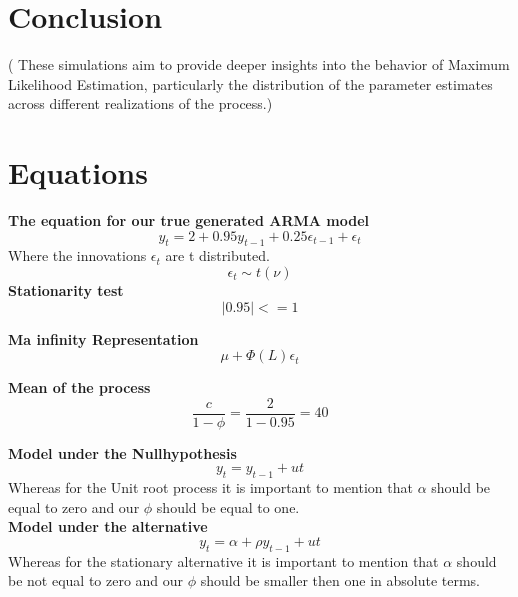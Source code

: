 \documentclass[12pt]{article}
\begin{document}
\section{Conclusion}
( These simulations aim to provide deeper insights into the behavior of Maximum Likelihood Estimation, particularly the distribution of the parameter estimates across different realizations of the process.)






\newpage
\section{Equations}
\textbf{The equation for our true generated ARMA model}
\begin{equation}
    y_t = 2 + 0.95y_{t-1} + 0.25\epsilon_{t-1} + \epsilon_t
\label{eq:arma}
\end{equation}
Where the innovations $\epsilon_t$ are t distributed.
 \begin{equation}
     \epsilon_t \sim t(\nu) 
 \end{equation}
\textbf{Stationarity test}
\begin{equation}
    |0.95| <= 1
    \label{eq:stat}
\end{equation}

\textbf{Ma infinity Representation}
 \begin{equation}
    \mu + \Phi(L)\epsilon_t
    \label{eq:Mainf}
 \end{equation}

 \textbf{Mean of the process}
 \begin{equation}
\frac{c}{1-\phi} = \frac{2}{1-0.95} = 40
\label{eq:Mean}
\end{equation}

\textbf{Model under the Nullhypothesis}
\begin{equation}
    y_t = y_{t-1} + ut
    \label{eq:true}
\end{equation}
Whereas for the Unit root process it is important to mention that $\alpha$ should be equal to zero and our $\phi$ should be equal to one.\\

\textbf{Model under the alternative}
\begin{equation}
    y_t = \alpha + \rho y_{t-1} + ut
    \label{eq:alternative}
\end{equation}
Whereas for the stationary alternative it is important to mention that $\alpha$ should be not equal to zero and our $\phi$ should be smaller then one in absolute terms.\\
\end{document}

